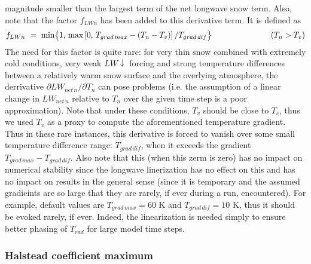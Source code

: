 {magnitude smaller than the largest term of the net longwave snow term.
%
Also, note that the factor $f_{LWn}$ has been added to this derivative
term. It is defined as
%
\begin{equation}
\label{eq:isba_dlwnetn_dtn_factor}
f_{LWn} \,\, =\,\,  {\rm min}\big\lbrace 1, \,
{\rm max}\left[0, \,
T_{grad\, max} - \left(T_n - T_v\right)
\right]/T_{grad\, dif}
\big\rbrace
\hskip1.in
\left( T_n > T_v \right)
\end{equation}
%
The need for this factor
is quite rare: for very thin snow combined with extremely cold 
conditions, very weak $LW\downarrow$ forcing and strong temperature differences
between a relatively warm snow surface and the overlying atmosphere,
the derrivative $\partial LW_{net\,n}/\partial T_n$ can pose problems (i.e. the assumption of
a linear change in $LW_{net\,n}$ relative to $T_n$ over the given time
step is a poor approximation).
Note that under these conditions, $T_v$ should be close to $T_c$, thus
we used $T_v$ as a proxy to compute the aforementioned temperature gradient.
Thus in these rare instances, this derivative is forced
to vanish over some small temperature difference 
range: $T_{grad\,dif}$, when it exceeds the gradient $T_{grad\, max}-T_{grad\, dif}$. 
Also note that this (when this zerm is zero) has no impact
on numerical stability since the longwave linerization has no effect
on this and has
no impact on results in the general sense (since it is temporary and the assumed gradieints
are so large that they are rarely, if ever during a run,
encountered). 
For example, default values are $T_{grad\, max}=60$ K and $T_{grad\,dif}=10$ K,
thus it should be evoked rarely, if ever. 
Indeed, the linearization is needed simply to ensure
better phasing of $T_{rad}$ for large model time steps.

\subsubsection{Halstead coefficient maximum} 
\label{app:meb_halstead_limit}

}
